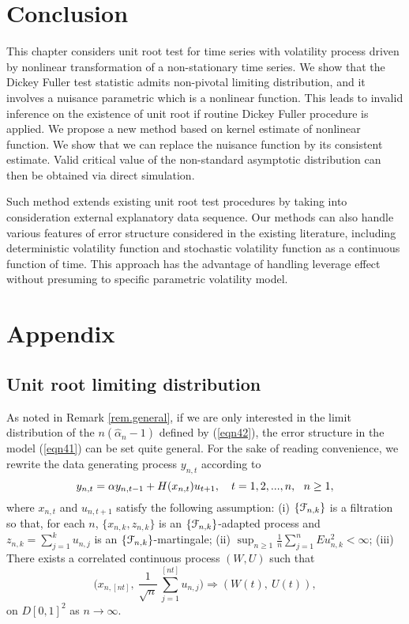 \section{Conclusion} 
This chapter considers unit root test for time series with volatility process driven by nonlinear transformation of a non-stationary time series. We show that the Dickey Fuller test statistic admits non-pivotal limiting distribution, and it involves a nuisance parametric which is a nonlinear function. This leads to invalid inference on the existence of unit root if routine Dickey Fuller procedure is applied. We propose a new method based on kernel estimate of nonlinear function. We show that we can replace the nuisance function by its consistent estimate. Valid critical value of the non-standard asymptotic distribution can then be obtained via direct simulation.

Such method extends existing unit root test procedures by taking into consideration external explanatory data sequence. Our methods can also handle various features of error structure considered in the existing literature, including deterministic volatility function and stochastic volatility function as a continuous function of time. This approach has the advantage of handling leverage effect without presuming to specific parametric volatility model.


\section{Appendix} 




\subsection{Unit root limiting distribution} 
As noted in Remark \ref{rem.general}, if we are only interested in the limit distribution of the $n(\widehat \alpha_n - 1)$ defined by (\ref{eqn42}), the error structure in the model (\ref{eqn41}) can be set quite general.
For the sake of  reading convenience, we rewrite the data generating process  $y_{n,t}$  according to
\begin{equation} y_{n,t} = \alpha y_{n,t-1} + H(x_{n,t}) u_{t+1},
\quad t=1,2,...,n,\ \ n\ge 1, \la {77}\end{equation} where $x_{n,t}$ and $u_{n, t+1}$ satisfy the following assumption: (i) $\{{\cal F}_{n,k}\}  $ is  a filtration
so that, for each $n$, $\{x_{n,k}, z_{n,k}\}$ is an $\{{\cal F}_{n,k}\}$-adapted process and $z_{n,k}=\sum_{j=1}^ku_{n,j}$ is an $\{{\cal F}_{n,k}\}$-martingale; (ii) $\sup_{n\ge 1}\frac 1n \sum_{j=1}^nEu_{n,k}^2<\infty$; (iii)
 There exists    a correlated continuous process $(W,U)$ such that
\begin{equation}
\Big(x_{n,[nt]},\ \frac 1{\sqrt n}\,
 \sum_{j=1}^{[nt]}u_{n,j}\Big)
\Rightarrow (W(t),\ U(t)),
\label{tt1}
\end{equation}
on $D[0,1]^2$ as $n\rightarrow \infty.$


